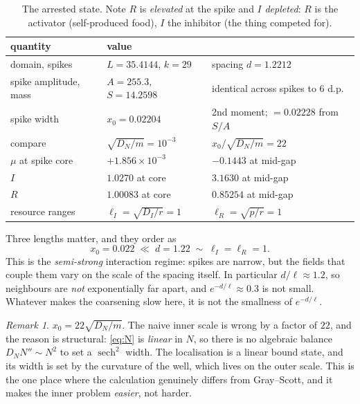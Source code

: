 \documentclass[11pt,a4paper]{article}
\newcommand{\lI}{\ell_I}
\newcommand{\lR}{\ell_R}
\theoremstyle{plain}
\theoremstyle{remark}
\newtheorem*{rem}{Remark}
\begin{document}
\begin{table}[h]
\centering
\begin{tabular}{lll}
\toprule
quantity & value & \\
\midrule
domain, spikes            & $L=35.4144$, $k=29$          & spacing $d = 1.2212$ \\
spike amplitude, mass     & $A = 255.3$, $S=14.2598$     & identical across spikes to $6$ d.p. \\
spike width               & $x_0 = 0.02204$              & 2nd moment; $= 0.02228$ from $S/A$ \\
compare                   & $\sqrt{D_N/m} = 10^{-3}$     & $x_0/\sqrt{D_N/m} = 22$ \\
$\mu$ at spike core       & $+1.856\times10^{-3}$        & $-0.1443$ at mid-gap \\
$I$                       & $1.0270$ at core             & $3.1630$ at mid-gap \\
$R$                       & $1.00083$ at core            & $0.85254$ at mid-gap \\
resource ranges           & $\lI = \sqrt{D_I/r} = 1$     & $\lR = \sqrt{p/r} = 1$ \\
\bottomrule
\end{tabular}
\caption{The arrested state. Note $R$ is \emph{elevated} at the spike and $I$
\emph{depleted}: $R$ is the activator (self-produced food), $I$ the inhibitor
(the thing competed for).}
\label{tab:state}
\end{table}

Three lengths matter, and they order as
\begin{equation}
  x_0 = 0.022 \;\ll\; d = 1.22 \;\sim\; \lI = \lR = 1 .
\end{equation}
This is the \emph{semi-strong} interaction regime: spikes are narrow, but the
fields that couple them vary on the scale of the spacing itself. In particular
$d/\ell \approx 1.2$, so neighbours are \emph{not} exponentially far apart, and
$e^{-d/\ell}\approx 0.3$ is not small. Whatever makes the coarsening slow here,
it is not the smallness of $e^{-d/\ell}$.

\begin{rem}
$x_0 = 22\sqrt{D_N/m}$. The naive inner scale is wrong by a factor of $22$,
and the reason is structural: \eqref{eq:N} is \emph{linear} in $N$, so there is
no algebraic balance $D_N N'' \sim N^2$ to set a $\operatorname{sech}^2$ width.
The localisation is a linear bound state, and its width is set by the curvature
of the well, which lives on the outer scale. This is the one place where the
calculation genuinely differs from Gray--Scott, and it makes the inner problem
\emph{easier}, not harder.
\end{rem}
\end{document}
